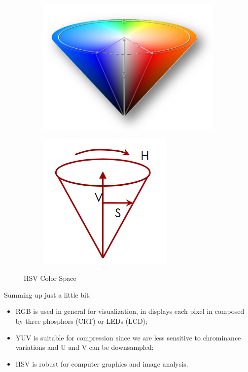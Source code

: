 \begin{figure}[h]
    \begin{subfigure}{0.5\textwidth}
        \includegraphics[scale=0.4]{Figures/HSV1.png} 
        \label{fig:subim1}
    \end{subfigure}
    \begin{subfigure}{0.5\textwidth}
        \includegraphics[scale=0.5]{Figures/HSV2.png}
        \label{fig:subim2}
    \end{subfigure}
        
        \caption{HSV Color Space}
        \label{fig:image2}
\end{figure}

Summing up just a little bit:
\begin{itemize}
    \item RGB is used in general for visualization, in displays each pixel in composed by three phosphors (CRT) or LEDs (LCD);
    \item YUV is suitable for compression since we are less sensitive to chrominance variations and U and V can be downsampled;
    \item HSV is robust for computer graphics and image analysis.
\end{itemize}

